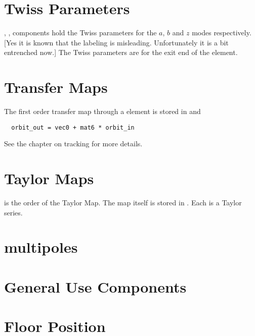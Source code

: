 \section{Twiss Parameters}

, ,  components hold the Twiss parameters for the 
$a$, $b$ and $z$ modes respectively. [Yes it is known that the
labeling is misleading. Unfortunately it is a bit entrenched now.]
The Twiss parameters are for the exit end of the element.

\section{Transfer Maps}

The first order transfer map through a element is stored in 
and 
\begin{verbatim}
  orbit_out = vec0 + mat6 * orbit_in
\end{verbatim}
See the chapter on tracking for more details.

\section{Taylor Maps}

 is the order of the Taylor Map. The map itself is stored 
in . Each  is a Taylor series. 

\section {multipoles}

\section{General Use Components}

\section{Floor Position}

